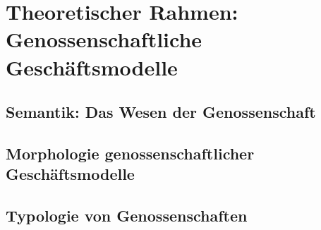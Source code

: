 \section{Theoretischer Rahmen: Genossenschaftliche Geschäftsmodelle}

\subsection{Semantik: Das Wesen der Genossenschaft}

\subsection{Morphologie genossenschaftlicher Geschäftsmodelle}



\subsection{Typologie von Genossenschaften}

